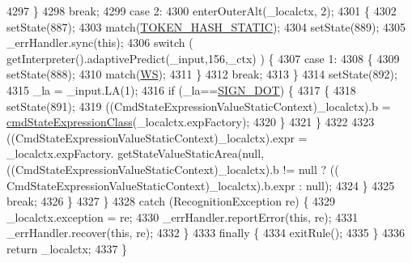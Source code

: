 \begin{DoxyCode}
4297         \}
4298         \textcolor{keywordflow}{break};
4299       \textcolor{keywordflow}{case} 2:
4300         enterOuterAlt(\_localctx, 2);
4301         \{
4302         setState(887);
4303         match(\hyperlink{classgov_1_1nasa_1_1jpf_1_1inspector_1_1server_1_1expression_1_1parser_1_1_expression_grammar_parser_a291146c24b193dc8ab6fbe0b40432881}{TOKEN\_HASH\_STATIC});
4304         setState(889);
4305         \_errHandler.sync(\textcolor{keyword}{this});
4306         \textcolor{keywordflow}{switch} ( getInterpreter().adaptivePredict(\_input,156,\_ctx) ) \{
4307         \textcolor{keywordflow}{case} 1:
4308           \{
4309           setState(888);
4310           match(\hyperlink{classgov_1_1nasa_1_1jpf_1_1inspector_1_1server_1_1expression_1_1parser_1_1_expression_grammar_parser_ace44714ae633c7b14794cc5a24d9ebf3}{WS});
4311           \}
4312           \textcolor{keywordflow}{break};
4313         \}
4314         setState(892);
4315         \_la = \_input.LA(1);
4316         \textcolor{keywordflow}{if} (\_la==\hyperlink{classgov_1_1nasa_1_1jpf_1_1inspector_1_1server_1_1expression_1_1parser_1_1_expression_grammar_parser_af578d1cac8553bcf6f52608a4e9125f1}{SIGN\_DOT}) \{
4317           \{
4318           setState(891);
4319           ((CmdStateExpressionValueStaticContext)\_localctx).b = 
      \hyperlink{classgov_1_1nasa_1_1jpf_1_1inspector_1_1server_1_1expression_1_1parser_1_1_expression_grammar_parser_a7a61b20a8b2616173f6b566712b279dd}{cmdStateExpressionClass}(\_localctx.expFactory);
4320           \}
4321         \}
4322 
4323          ((CmdStateExpressionValueStaticContext)\_localctx).expr =  \_localctx.expFactory.
      getStateValueStaticArea(null,            ((CmdStateExpressionValueStaticContext)\_localctx).b != null ? ((
      CmdStateExpressionValueStaticContext)\_localctx).b.expr : null); 
4324         \}
4325         \textcolor{keywordflow}{break};
4326       \}
4327     \}
4328     \textcolor{keywordflow}{catch} (RecognitionException re) \{
4329       \_localctx.exception = re;
4330       \_errHandler.reportError(\textcolor{keyword}{this}, re);
4331       \_errHandler.recover(\textcolor{keyword}{this}, re);
4332     \}
4333     \textcolor{keywordflow}{finally} \{
4334       exitRule();
4335     \}
4336     \textcolor{keywordflow}{return} \_localctx;
4337   \}
\end{DoxyCode}
